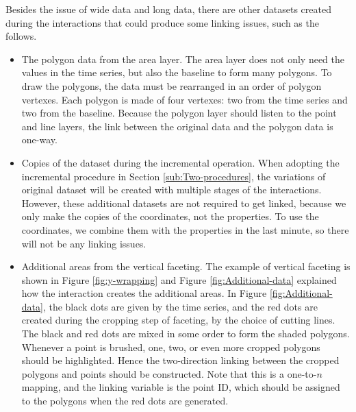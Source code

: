 \documentclass[12pt]{article}
\begin{document}
Besides the issue of wide data and long data, there are other datasets
created during the interactions that could produce some linking issues,
such as the follows.
\begin{itemize} \itemsep 0in
\item The polygon data from the area layer.
The area layer does not
only need the values in the time series, but also the baseline to
form many polygons. To draw the polygons, the data must be rearranged
in an order of polygon vertexes. Each polygon is made of four vertexes:
two from the time series and two from the baseline. Because the polygon
layer should listen to the point and line layers, the link between
the original data and the polygon data is one-way.

\item Copies of the dataset during the incremental operation.
When adopting the incremental procedure in Section
\ref{sub:Two-procedures}, the variations of original dataset will
be created with multiple stages of the interactions. However, these
additional datasets are not required to get linked, because we only
make the copies of the coordinates, not the properties. To use the
coordinates, we combine them with the properties in the last minute,
so there will not be any linking issues.

\item Additional areas from the vertical faceting.
The example of vertical faceting is shown in Figure \ref{fig:y-wrapping}
and Figure \ref{fig:Additional-data} explained how the interaction
creates the additional areas. In Figure \ref{fig:Additional-data},
the black dots are given by the time series, and the red dots are
created during the cropping step of faceting, by the choice of
cutting lines. The black and red dots are mixed in some order to
form the shaded polygons. Whenever a point is brushed, one, two,
or even more cropped polygons should be highlighted. Hence the
two-direction linking between the cropped polygons and points
should be constructed. Note that this is a one-to-$n$ mapping,
and the linking variable is the point ID, which should be assigned
to the polygons when the red dots are generated.


\end{itemize}
\end{document}
